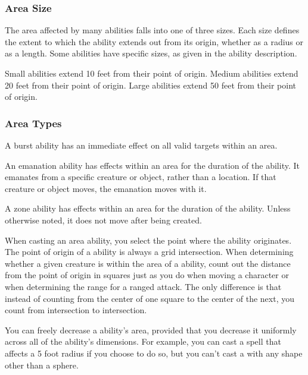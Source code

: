         \subsubsection{Area Size}

            The area affected by many abilities falls into one of three sizes.
            Each size defines the extent to which the ability extends out from its origin, whether as a radius or as a length.
            Some abilities have specific sizes, as given in the ability description.

             Small abilities extend 10 feet from their point of origin.
             Medium abilities extend 20 feet from their point of origin.
             Large abilities extend 50 feet from their point of origin.

        \subsubsection{Area Types}\label{Area Types}

             A burst ability has an immediate effect on all valid targets within an area.

             An emanation ability has effects within an area for the duration of the ability.
            It emanates from a specific creature or object, rather than a location.
            If that creature or object moves, the emanation moves with it.

             A zone ability has effects within an area for the duration of the ability.
            Unless otherwise noted, it does not move after being created.

            When casting an area ability, you select the point where the ability originates.
            The point of origin of a ability is always a grid intersection.
            When determining whether a given creature is within the area of a ability, count out the distance from the point of origin in squares just as you do when moving a character or when determining the range for a ranged attack.
            The only difference is that instead of counting from the center of one square to the center of the next, you count from intersection to intersection.

            You can freely decrease a ability's area, provided that you decrease it uniformly across all of the ability's dimensions.
            For example, you can cast a  spell that affects a 5 foot radius if you choose to do so, but you can't cast a  with any shape other than a sphere.

